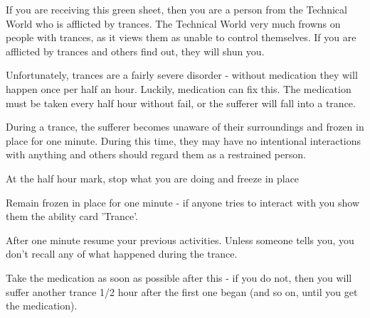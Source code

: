 \documentclass[green]{guildcamp3}
\begin{document}
	
	\name{\gTrance{}}
		
	If you are receiving this green sheet, then you are a person from the Technical World who is afflicted by trances. The Technical World very much frowns on people with trances, as it views them as unable to control themselves. If you are afflicted by trances and others find out, they will shun you. 
	
	Unfortunately, trances are a fairly severe disorder - without medication they will happen once per half an hour. Luckily, medication can fix this. The medication must be taken every half hour without fail, or the sufferer will fall into a trance. 
	
	During a trance, the sufferer becomes unaware of their surroundings and frozen in place for one minute. During this time, they may have no intentional interactions with anything and others should regard them as a restrained person. 
	
	
	\begin{enum}[Directions]
		\item At the half hour mark, stop what you are doing and freeze in place
		\item Remain frozen in place for one minute - if anyone tries to interact with you show them the ability card 'Trance'. 
		\item After one minute resume your previous activities. Unless someone tells you, you don't recall any of what happened during the trance.
		\item Take the medication as soon as possible after this - if you do not, then you will suffer another trance 1/2 hour after the first one began (and so on, until you get the medication).
	\end{enum}
	
	
\end{document}

